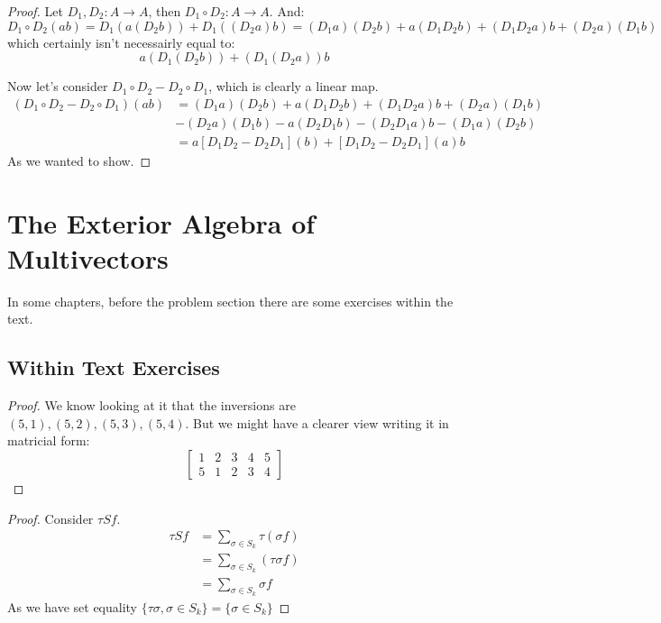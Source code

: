 \begin{problem}
\end{problem}
\begin{proof}
	Let $D_1,D_2: A \to A$, then $D_1 \circ D_2 : A \to A$. And:
	$$D_1 \circ D_2 (ab) = D_1(a(D_2b)) + D_1((D_2a)b) = (D_1a)(D_2b) + a(D_1D_2b) + (D_1D_2a)b + (D_2a)(D_1b)$$
	which certainly isn't necessairly equal to:
	$$a(D_1(D_2b)) + (D_1(D_2a))b$$

	Now let's consider $D_1 \circ D_2 - D_2 \circ D_1$, which is clearly a linear map.
	\begin{align*}
		(D_1 \circ D_2 - D_2 \circ D_1)(ab) & = (D_1a)(D_2b) + a(D_1D_2b) + (D_1D_2a)b + (D_2a)(D_1b) \\
		                                    & - (D_2a)(D_1b) - a(D_2D_1b) - (D_2D_1a)b - (D_1a)(D_2b) \\
		                                    & = a[D_1D_2 - D_2D_1](b) + [D_1D_2 - D_2D_1](a)b
	\end{align*}
	As we wanted to show.
\end{proof}

\section{The Exterior Algebra of Multivectors}
In some chapters, before the problem section there are some exercises within the text.
\subsection{Within Text Exercises}

\begin{customprob}{3.6}
\end{customprob}


\begin{proof}
	We know looking at it that the inversions are $(5,1), (5,2), (5,3), (5,4)$. But we might have a clearer view writing it
	in matricial form:
	$$
		\begin{bmatrix}
			1 & 2 & 3 & 4 & 5 \\
			5 & 1 & 2 & 3 & 4
		\end{bmatrix}
	$$
\end{proof}

\begin{customprob}{3.13}
\end{customprob}
\begin{proof}
	Consider $\tau Sf$.
	\begin{align*}
		\tau Sf & = \sum_{\sigma \in S_k} \tau(\sigma f) \\
		        & = \sum_{\sigma \in S_k} (\tau\sigma f) \\
		        & = \sum_{\sigma \in S_k} \sigma f
	\end{align*}
	As we have set equality $\{\tau \sigma, \sigma \in S_k\} = \{\sigma \in S_k\}$
\end{proof}


